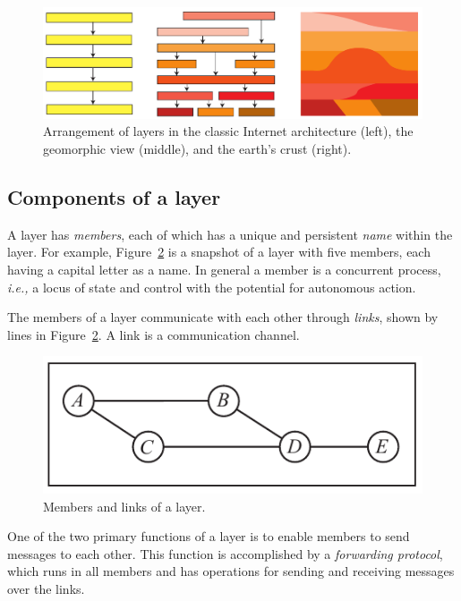 \begin{figure}
\centering
\includegraphics[scale=0.45]{figures/geoname.pdf}
\caption{Arrangement of layers in the classic Internet architecture
(left), the geomorphic view (middle), and the earth's crust (right).}
\label{fig:geoname}
\end{figure}

\subsection{Components of a layer}
\label{sec:layercomponents}

A layer has {\it members}, each of which has a unique and persistent
{\it name} within the layer.
For example, Figure~\ref{fig:layer} is a snapshot of a layer with five
members, each having a capital letter as a name.
In general a member is a concurrent process, {\it i.e.,} a locus
of state and control with the potential for autonomous action.

The members of a layer communicate with each other through {\it links},
shown by lines in Figure~\ref{fig:layer}.
A link is a communication channel.

\begin{figure}
\centering
\includegraphics[scale=0.80]{figures/littlelayer.pdf}
\caption{Members and links of a layer.}
\label{fig:layer}
\end{figure}

One of the two primary functions of a layer is to enable members to send
messages to each other.
This function is accomplished by a {\it forwarding protocol},
which runs in all members and has operations for sending and
receiving messages over the links.

